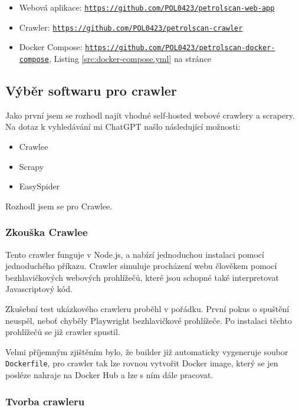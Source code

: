 \begin{itemize}
    \item Webová aplikace:
        \texttt{\url{https://github.com/POL0423/petrolscan-web-app}}
    \item Crawler:
        \texttt{\url{https://github.com/POL0423/petrolscan-crawler}}
    \item Docker Compose:
        \texttt{\url{https://github.com/POL0423/petrolscan-docker-compose}},
        Listing \ref{src:docker-compose.yml} na stránce
        \pageref{src:docker-compose.yml}
\end{itemize}

\subsection{Výběr softwaru pro crawler}

Jako první jsem se rozhodl najít vhodné self-hosted webové crawlery
a scrapery. Na dotaz k vyhledávání mi ChatGPT našlo následující možnosti:

\begin{itemize}
    \item Crawlee
    \item Scrapy
    \item EasySpider
\end{itemize}

Rozhodl jsem se pro Crawlee.

\subsubsection{Zkouška Crawlee}

Tento crawler funguje v Node.js, a nabízí jednoduchou instalaci pomocí
jednoduchého příkazu. Crawler simuluje procházení webu člověkem pomocí
bezhlavičkových webových prohlížečů, které jsou schopné také interpretovat
Javascriptový kód.

Zkušební test ukázkového crawleru proběhl v pořádku.
První pokus o spuštění neuspěl, neboť chyběly Playwright bezhlavičkové
prohlížeče. Po instalaci těchto prohlížečů se již crawler spustil.

Velmi příjemným zjištěním bylo, že builder již automaticky vygeneruje
soubor \texttt{Dockerfile}, pro crawler tak lze rovnou vytvořit
Docker image, který se jen posléze nahraje na Docker Hub a lze s ním
dále pracovat.

\subsubsection{Tvorba crawleru}

